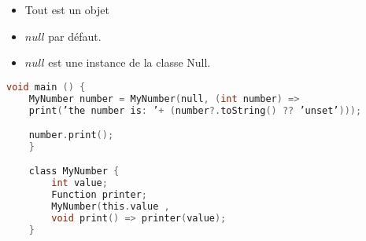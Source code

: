 \documentclass[10pt]{beamer}
\begin{document}
\begin{itemize}
    \item Tout est un objet
    \item $null$ par défaut.
    \item $null$ est une instance de la classe Null.
\end{itemize}
\begin{lstlisting}[caption={Visibilité},language=C]
    void main () {
    MyNumber number = MyNumber(null, (int number) =>
    print(’the number is: ’+ (number?.toString() ?? ’unset’)));

    number.print(); 
    }

    class MyNumber {
        int value;
        Function printer; 
        MyNumber(this.value ,
        void print() => printer(value);
    }
    \end{lstlisting}
\end{document}
